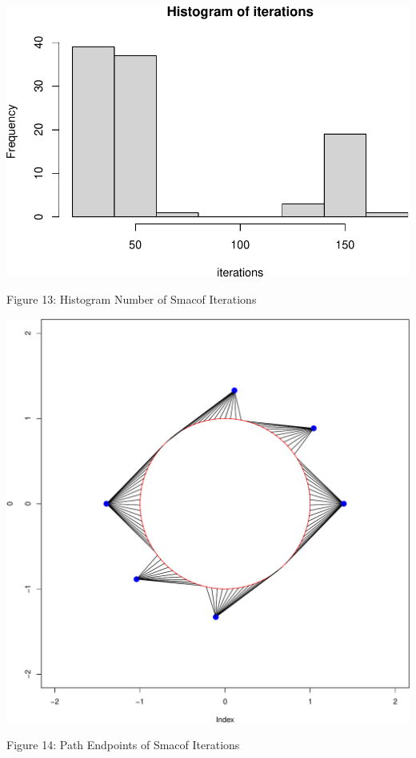 \documentclass[
  12pt,
]{article}
\begin{document}
\begin{center}\includegraphics{twoPoints_files/figure-latex/histogram_smacof-1} \end{center}

Figure 13: Histogram Number of Smacof Iterations

\begin{center}\includegraphics{twoPoints_files/figure-latex/path_smacof-1} \end{center}

Figure 14: Path Endpoints of Smacof Iterations
\end{document}
